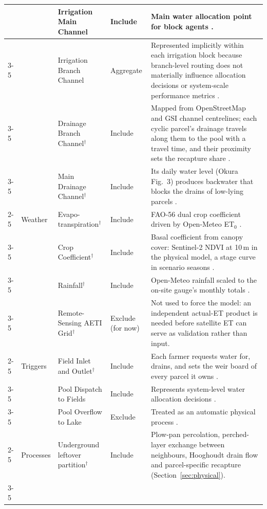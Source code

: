 \documentclass{article}
\begin{document}
\begin{changed}
\begin{tabular}{|p{0.5cm}|p{1.6cm}|p{2.2cm}|p{1.6cm}|p{10.8cm}|}
     & & Irrigation Main Channel & Include & Main water allocation point for block agents \cite{OkuraBudiasaKato2022, Okura2025WaterBalance}. \\ \cline{3-5}
     & & Irrigation Branch Channel & Aggregate & Represented implicitly within each irrigation block because branch-level routing does not materially influence allocation decisions or system-scale performance metrics \cite{Okura2025WaterBalance}. \\ \cline{3-5}
     & & Drainage Branch Channel$^\dagger$ & Include & Mapped from OpenStreetMap and GSI channel centrelines; each cyclic parcel's drainage travels along them to the pool with a travel time, and their proximity sets the recapture share \cite{Tabuchi1985Paddy, Shiratani2004Subsurface, Maruyama2008}. \\ \cline{3-5}
     & & Main Drainage Channel$^\dagger$ & Include & Its daily water level (Okura Fig.~3) produces backwater that blocks the drains of low-lying parcels \cite{Okura2025WaterBalance, Shiratani2004Subsurface}. \\ \cline{2-5}
     & Weather & Evapo-transpiration$^\dagger$ & Include & FAO-56 dual crop coefficient driven by Open-Meteo ET$_0$ \cite{Allen1998FAO56}. \\ \cline{3-5}
     & & Crop Coefficient$^\dagger$ & Include & Basal coefficient from canopy cover: Sentinel-2 NDVI at 10\,m in the physical model, a stage curve in scenario seasons \cite{CarlsonRipley1997}. \\ \cline{3-5}
     & & Rainfall$^\dagger$ & Include & Open-Meteo rainfall scaled to the on-site gauge's monthly totals \cite{Okura2025WaterBalance}. \\ \cline{3-5}
     & & Remote-Sensing AETI Grid$^\dagger$ & Exclude (for now) & Not used to force the model: an independent actual-ET product is needed before satellite ET can serve as validation rather than input. \\ \cline{2-5}
     & Triggers & Field Inlet and Outlet$^\dagger$ & Include & Each farmer requests water for, drains, and sets the weir board of every parcel it owns \cite{Alam2022}. \\ \cline{3-5}
     & & Pool Dispatch to Fields & Include & Represents system-level water allocation decisions \cite{Bahrami2022, Hyun2019}. \\ \cline{3-5}
     & & Pool Overflow to Lake & Exclude & Treated as an automatic physical process \cite{Okura2025WaterBalance}. \\ \cline{2-5}
     & Processes & Underground leftover partition$^\dagger$ & Include & Plow-pan percolation, perched-layer exchange between neighbours, Hooghoudt drain flow and parcel-specific recapture (Section~\ref{sec:physical}). \\ \cline{3-5}

\end{tabular}
\end{changed}
\end{document}
